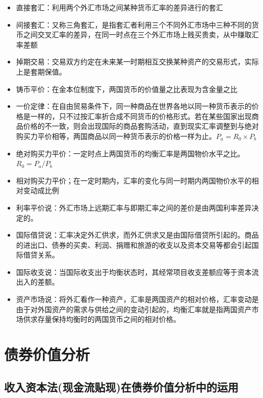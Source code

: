 \documentclass{article}
\begin{document}
\begin{spacing}{0.9}
\begin{itemize}
            \item    直接套汇：利用两个外汇市场之间某种货币汇率的差异进行的套汇
            \item    间接套汇：又称三角套汇，是指套汇者利用三个不同外汇市场中三种不同的货币之间交叉汇率的差异，在同一时点在三个外汇市场上贱买贵卖，从中赚取汇率差额
            \item   掉期交易：交易双方约定在未来某一时期相互交换某种资产的交易形式，实际上是套期保值。
            \item   铸币平价：在金本位制度下，两国货币的价值量之比表现为含金量之比
            \item    一价定律：在自由贸易条件下，同一种商品在世界各地以同一种货币表示的价格是一样的，只不过按汇率折合成不同货币的价格形式。若在某些国家出现商品价格的不一致，则会出现国际的商品套购活动，直到现实汇率调整到与绝对购买力平价相等，两国商品以同一种货币表示的价格一样为止。$P_a=R_0 \times P_b$
            \item   绝对购买力平价：一定时点上两国货币的均衡汇率是两国物价水平之比。$R_0  =P_a  /P_b$
            \item   相对购买力平价；在一定时期内，汇率的变化与同一时期内两国物价水平的相对变动成比例
            \item   利率平价说：外汇市场上远期汇率与即期汇率之间的差价是由两国利率差异决定的。
            \item    国际借贷说：汇率决定外汇供求，而外汇供求又是由国际借贷所引起的。商品的进出口、债券的买卖、利润、捐赠和旅游的收支以及资本交易等都会引起国际借贷关系。
            \item    国际收支说：当国际收支出于均衡状态时，其经常项目收支差额应等于资本流出入的差额。
            \item   资产市场说：将外汇看作一种资产，汇率是两国资产的相对价格，汇率变动是由于对外国资产的需求与供给之间的变动引起的，均衡汇率就是指两国资产市场供求存量保持均衡时的两国货币之间的相对价格。
        \end{itemize}
    \end{spacing}

\clearpage

\section*{\center\Huge 债券价值分析}
\subsection*{收入资本法(现金流贴现)在债券价值分析中的运用}
\end{document}
